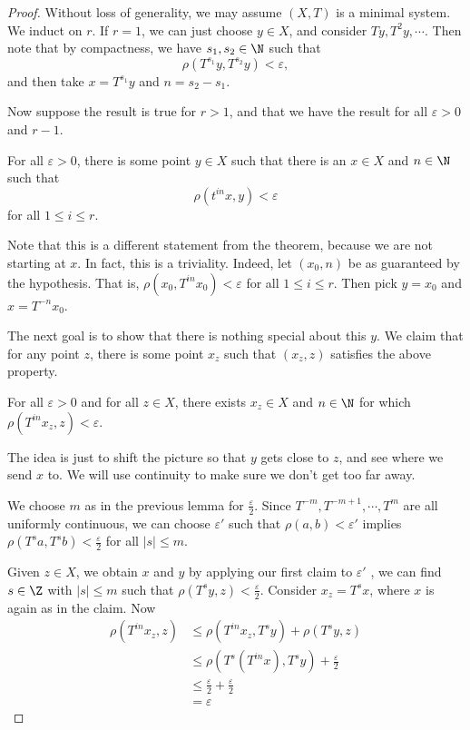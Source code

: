 \documentclass[a4paper]{article}
\begin{document}
\begin{proof}
  Without loss of generality, we may assume $(X, T)$ is a minimal system. We induct on $r$. If $r = 1$, we can just choose $y \in X$, and consider $T y, T^2 y, \cdots$. Then note that by compactness, we have $s_1, s_2 \in \N$ such that
  \[
    \rho(T^{s_1} y,T^{s_2} y) < \varepsilon,
  \]
  and then take $x = T^{s_1} y$ and $n = s_2 - s_1$.

  Now suppose the result is true for $r > 1$, and that we have the result for all $\varepsilon > 0$ and $r - 1$.
  \begin{claim}
    For all $\varepsilon > 0$, there is some point $y \in X$ such that there is an $x \in X$ and $n \in \N$ such that
    \[
      \rho(t^{in} x, y) < \varepsilon
    \]
    for all $1 \leq i \leq r$.
  \end{claim}
  Note that this is a different statement from the theorem, because we are not starting at $x$. In fact, this is a triviality. Indeed, let $(x_0, n)$ be as guaranteed by the hypothesis. That is, $\rho(x_0, T^{in}x_0) < \varepsilon$ for all $1 \leq i \leq r$. Then pick $y = x_0$ and $x = T^{-n}x_0$.

  The next goal is to show that there is nothing special about this $y$. We claim that for any point $z$, there is some point $x_z$ such that $(x_z, z)$ satisfies the above property.
  \begin{claim}
    For all $\varepsilon > 0$ and for all $z \in X$, there exists $x_z \in X$ and $n \in \N$ for which $\rho(T^{in} x_z, z) < \varepsilon$.
  \end{claim}
  The idea is just to shift the picture so that $y$ gets close to $z$, and see where we send $x$ to. We will use continuity to make sure we don't get too far away.

  We choose $m$ as in the previous lemma for $\frac{\varepsilon}{2}$. Since $T^{-m}, T^{-m + 1}, \cdots, T^m$ are all uniformly continuous, we can choose $\varepsilon'$ such that $\rho(a, b) < \varepsilon'$ implies $\rho(T^s a, T^s b) < \frac{\varepsilon}{2}$ for all $|s| \leq m$.

  Given $z \in X$, we obtain $x$ and $y$ by applying our first claim to $\varepsilon'$ , we can find $s \in \Z$ with $|s| \leq m$ such that $\rho(T^s y, z) < \frac{\varepsilon}{2}$. Consider $x_z = T^s x$, where $x$ is again as in the claim. Now
  \begin{align*}
    \rho(T^{in} x_z, z) &\leq \rho(T^{in} x_z, T^s y) + \rho(T^s y, z) \\
    &\leq \rho(T^s(T^{in}x), T^s y) + \frac{\varepsilon}{2}\\
    &\leq \frac{\varepsilon}{2} + \frac{\varepsilon}{2}\\
    &= \varepsilon
  \end{align*}


\end{proof}
\end{document}
